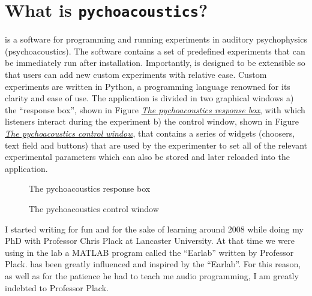 \documentclass[a4paper,12pt,english]{sphinxmanual}
\begin{document}
\section{What is \texttt{pychoacoustics}?}
\label{intro:what-is-pychoacoustics}
 is a software for programming and running experiments in auditory psychophysics (psychoacoustics). The software contains a set of predefined experiments that can be immediately run after installation. Importantly,  is designed to be extensible so that users can add new custom experiments with relative ease. Custom experiments are written in Python, a programming language renowned for its clarity and ease of use. The application is divided in two graphical windows a) the “response box”, shown in Figure {\hyperref[intro:fig-response-box]{\emph{The pychoacoustics response box}}}, with which listeners interact during the experiment b) the control window, shown in Figure {\hyperref[intro:fig-control-window]{\emph{The pychoacoustics control window}}}, that contains a series of widgets (choosers, text field and buttons) that are used by the experimenter to set all of the relevant experimental parameters which can also be stored and later reloaded into the application.
\begin{figure}[htbp]
\centering
\capstart

\caption{The pychoacoustics response box}\label{intro:fig-response-box}\end{figure}
\begin{figure}[htbp]
\centering
\capstart

\caption{The pychoacoustics control window}\label{intro:fig-control-window}\end{figure}

I started writing  for fun and for the sake of
learning around 2008 while doing my PhD with Professor Chris Plack at
Lancaster University. At that time we were using in the lab a MATLAB
program called the “Earlab” written by Professor Plack.
 has been greatly influenced and inspired by the
“Earlab”. For this reason, as well as for the patience he had to teach
me audio programming, I am greatly indebted to Professor Plack.
\end{document}
